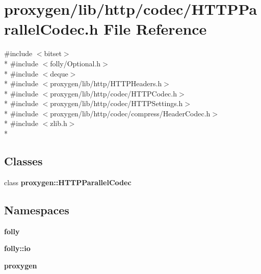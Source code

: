 \section{proxygen/lib/http/codec/\+H\+T\+T\+P\+Parallel\+Codec.h File Reference}
\label{HTTPParallelCodec_8h}
{\ttfamily \#include $<$bitset$>$}\\*
{\ttfamily \#include $<$folly/\+Optional.\+h$>$}\\*
{\ttfamily \#include $<$deque$>$}\\*
{\ttfamily \#include $<$proxygen/lib/http/\+H\+T\+T\+P\+Headers.\+h$>$}\\*
{\ttfamily \#include $<$proxygen/lib/http/codec/\+H\+T\+T\+P\+Codec.\+h$>$}\\*
{\ttfamily \#include $<$proxygen/lib/http/codec/\+H\+T\+T\+P\+Settings.\+h$>$}\\*
{\ttfamily \#include $<$proxygen/lib/http/codec/compress/\+Header\+Codec.\+h$>$}\\*
{\ttfamily \#include $<$zlib.\+h$>$}\\*
\subsection*{Classes}
\begin{DoxyCompactItemize}
\item 
class {\bf proxygen\+::\+H\+T\+T\+P\+Parallel\+Codec}
\end{DoxyCompactItemize}
\subsection*{Namespaces}
\begin{DoxyCompactItemize}
\item 
 {\bf folly}
\item 
 {\bf folly\+::io}
\item 
 {\bf proxygen}
\end{DoxyCompactItemize}
